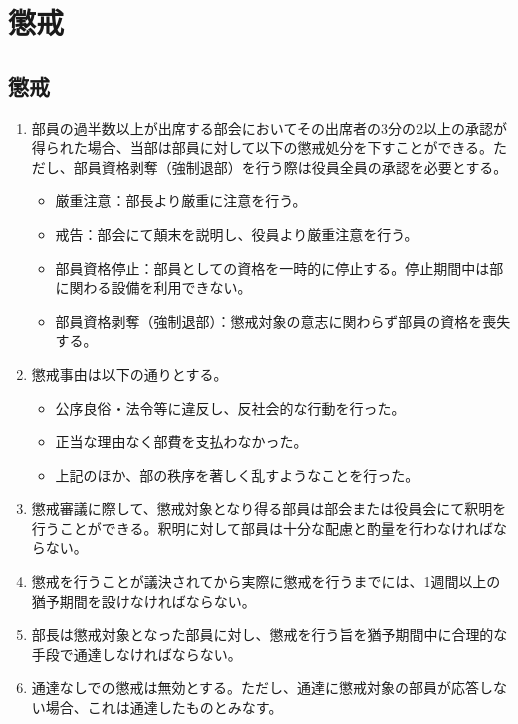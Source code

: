 \documentclass[12pt, unicode, a4paper]{ltjsreport}
\begin{document}
\chapter{懲戒}
    \section{懲戒}\label{disciplinary}
        \begin{enumerate}
            \item 部員の過半数以上が出席する部会においてその出席者の3分の2以上の承認が得られた場合、当部は部員に対して以下の懲戒処分を下すことができる。ただし、部員資格剥奪（強制退部）を行う際は役員全員の承認を必要とする。
            \begin{itemize}
                \item 厳重注意：部長より厳重に注意を行う。
                \item 戒告：部会にて顛末を説明し、役員より厳重注意を行う。
                \item 部員資格停止：部員としての資格を一時的に停止する。停止期間中は部に関わる設備を利用できない。
                \item 部員資格剥奪（強制退部）：懲戒対象の意志に関わらず部員の資格を喪失する。
            \end{itemize}
            \item 懲戒事由は以下の通りとする。
            \begin{itemize}
                \item 公序良俗・法令等に違反し、反社会的な行動を行った。
                \item 正当な理由なく部費を支払わなかった。
                \item 上記のほか、部の秩序を著しく乱すようなことを行った。
            \end{itemize}
            \item 懲戒審議に際して、懲戒対象となり得る部員は部会または役員会にて釈明を行うことができる。釈明に対して部員は十分な配慮と酌量を行わなければならない。
            \item 懲戒を行うことが議決されてから実際に懲戒を行うまでには、1週間以上の猶予期間を設けなければならない。
            \item 部長は懲戒対象となった部員に対し、懲戒を行う旨を猶予期間中に合理的な手段で通達しなければならない。
            \item 通達なしでの懲戒は無効とする。ただし、通達に懲戒対象の部員が応答しない場合、これは通達したものとみなす。
        \end{enumerate}
\end{document}
